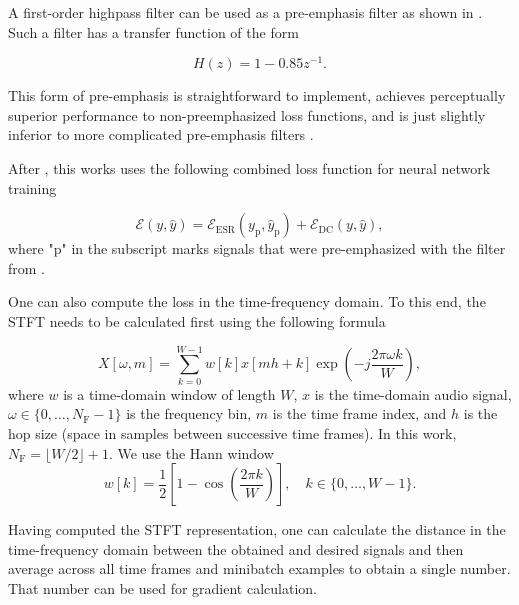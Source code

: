 A first-order highpass filter can be used as a pre-emphasis filter as shown in \cite{Wright2019,Wrightetal2020,Wright2020}. Such a filter has a transfer function of the form

\begin{equation}
  H(z) = 1 - 0.85 z^{-1}.
  \label{eq:preemphasis_filter}
\end{equation}

This form of pre-emphasis is straightforward to implement, achieves perceptually superior performance to non-preemphasized loss functions, and is just slightly inferior to more complicated pre-emphasis filters \cite{Wright2019a}.

After \cite{Wright2019a,Wright2020,Wright2019}, this works uses the following combined loss function for neural network training

\begin{equation}
  \mathcal{E}(y, \hat{y}) = \mathcal{E}_\text{ESR}(y_\text{p}, \hat{y}_\text{p}) + \mathcal{E}_\text{DC}(y, \hat{y}),
  \label{eq:final_loss_function}
\end{equation}
where "p" in the subscript marks signals that were pre-emphasized with the filter from .

One can also compute the loss in the time-frequency domain. To this end, the \ac{STFT} needs to be calculated first using the following formula \cite{Pytorch}

\begin{equation}
  X[\omega, m] = \sum \limits_{k=0}^{W-1} w[k] x[mh + k] \exp \left( -j\frac{2\pi \omega k}{W} \right),
\end{equation}
where $w$ is a time-domain window of length $W$, $x$ is the time-domain audio signal, $\omega \in \{0, \dots, N_\text{F}-1\}$ is the frequency bin, $m$ is the time frame index, and $h$ is the hop size (space in samples between successive time frames). In this work, $N_\text{F} = \lfloor W / 2 \rfloor + 1$. We use the Hann window \cite{Oppenheim2010}
\begin{equation}
  w[k] = \frac{1}{2} \left[ 1 - \cos \left( \frac{2\pi k}{W} \right) \right], \quad k \in \{0, \dots, W-1\}.
\end{equation}

Having computed the \ac{STFT} representation, one can calculate the distance in the time-frequency domain between the obtained and desired signals and then average across all time frames and minibatch examples to obtain a single number. That number can be used for gradient calculation.

